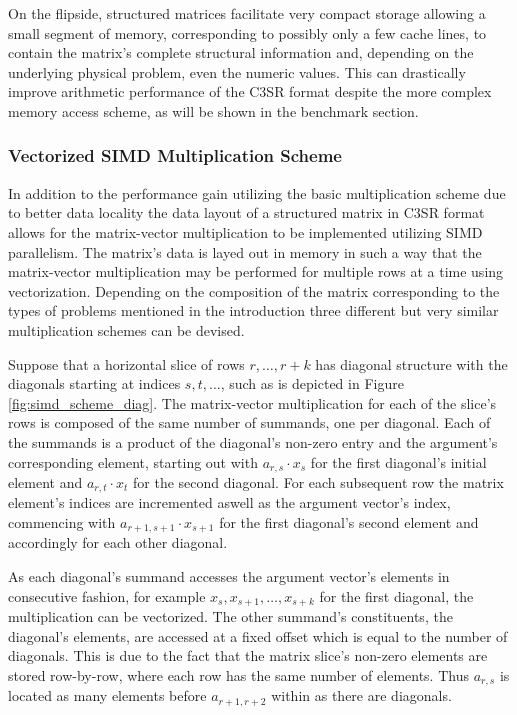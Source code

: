 \documentclass{article}
\begin{document}
      On the flipside, structured matrices facilitate very compact storage allowing a small segment of memory, corresponding to possibly only a few cache lines, to contain the matrix's complete structural information and, depending on the underlying physical problem, even the numeric values. This can drastically improve arithmetic performance of the C3SR format despite the more complex memory access scheme, as will be shown in the benchmark section.

    \subsubsection{Vectorized SIMD Multiplication Scheme} \label{subsubsec:vectorized-simd-multiplication-scheme}

      In addition to the performance gain utilizing the basic multiplication scheme due to better data locality the data layout of a structured matrix in C3SR format allows for the matrix-vector multiplication to be implemented utilizing SIMD parallelism. The matrix's data is layed out in memory in such a way that the matrix-vector multiplication may be performed for multiple rows at a time using vectorization. Depending on the composition of the matrix corresponding to the types of problems mentioned in the introduction three different but very similar multiplication schemes can be devised.

      Suppose that a horizontal slice of rows $r, \ldots, r+k$ has diagonal structure with the diagonals starting at indices $s, t, \ldots $, such as is depicted in Figure \ref{fig:simd_scheme_diag}. The matrix-vector multiplication for each of the slice's rows is composed of the same number of summands, one per diagonal. Each of the summands is a product of the diagonal's non-zero entry and the argument's corresponding element, starting out with $a_{r,s} \cdot x_s$ for the first diagonal's initial element and $a_{r,t} \cdot x_t$ for the second diagonal. For each subsequent row the matrix element's indices are incremented aswell as the argument vector's index, commencing with $a_{r+1, s+1} \cdot x_{s+1}$ for the first diagonal's second element and accordingly for each other diagonal.

      As each diagonal's summand accesses the argument vector's elements in consecutive fashion, for example $x_s, x_{s+1}, \ldots, x_{s + k}$ for the first diagonal, the multiplication can be vectorized. The other summand's constituents, the diagonal's elements, are accessed at a fixed offset which is equal to the number of diagonals. This is due to the fact that the matrix slice's non-zero elements are stored row-by-row, where each row has the same number of elements. Thus $a_{r,s}$ is located as many elements before $a_{r+1, r+2}$ within \V as there are diagonals.
\end{document}
